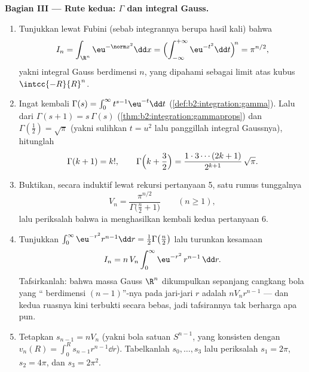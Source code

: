 \begin{problem}[{Soal akhir pekan --- $V_n =
\pi^{n/2}/\Gamma(\frac n2 + 1)$, dan keanehan dimensi
tinggi}]
\medskip
\noindent\textbf{Bagian III --- Rute kedua: $\Gamma$ dan
integral Gauss.}
\begin{enumerate}[resume]
  \item Tunjukkan lewat Fubini (sebab integrannya berupa hasil kali) bahwa
        \[
        I_n = \int_{\R^n}\eu^{-\norm
        x^2}\dd x
        = \Bigl(\int_{-\infty}^{+\infty}
        \eu^{-t^2}\dd t\Bigr)^{\!n} = \pi^{n/2},
        \]
        yakni integral Gauss berdimensi $n$, yang dipahami sebagai
        limit atas kubus $\intcc{-R}{R}^n$.
  \item Ingat kembali $\Gamma(s) = \int_0^\infty t^{s-1}\eu^{-t}\dd
        t$ (\cref{def:b2:integration:gamma}). Lalu dari
        $\Gamma(s+1) = s\,\Gamma(s)$
        (\cref{thm:b2:integration:gammaprops}) dan
        $\Gamma(\tfrac12) = \sqrt\pi$ (yakni sulihkan $t = u^2$
        lalu panggillah integral Gaussnya), hitunglah
        \[
        \Gamma(k + 1) = k!,
        \qquad
        \Gamma\Bigl(k + \frac32\Bigr) =
        \frac{1\cdot3\cdots(2k+1)}{2^{k+1}}\,\sqrt\pi .
        \]
  \item Buktikan, secara induktif lewat rekursi pertanyaan
        5, satu rumus tunggalnya
        \[
        V_n = \frac{\pi^{n/2}}{\Gamma\bigl(\frac n2 +
        1\bigr)} \qquad (n \geq 1),
        \]
        lalu periksalah bahwa ia menghasilkan kembali kedua  pertanyaan
        6.
  \item Tunjukkan $\int_0^\infty \eu^{-r^2}r^{n-1}\dd r =
        \tfrac12\Gamma\bigl(\tfrac n2\bigr)$ lalu turunkan
        kesamaan
        \[
        I_n = n\,V_n\int_0^\infty \eu^{-r^2}\,r^{n-1}\,\dd r.
        \]
        Tafsirkanlah: bahwa massa Gauss $\R^n$ dikumpulkan
        sepanjang cangkang bola yang
        `` berdimensi $(n-1)$''-nya pada jari-jari $r$ adalah
        $nV_nr^{n-1}$ --- dan kedua ruasnya kini terbukti
        secara bebas, jadi tafsirannya tak berharga apa pun.
  \item Tetapkan $s_{n-1} = nV_n$ (yakni  bola satuan
        $S^{n-1}$, yang konsisten dengan $v_n(R) = \int_0^R
        s_{n-1}r^{n-1}\dd r$). Tabelkanlah $s_0, \dots, s_3$ lalu
        periksalah $s_1 = 2\pi$, $s_2 = 4\pi$, dan $s_3 = 2\pi^2$.
\end{enumerate}


\end{problem}
